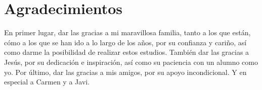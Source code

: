 \vspace{5cm}

\noindent \textbf{\myProf}

\chapter*{Agradecimientos}
\thispagestyle{empty}

       \vspace{1cm}

En primer lugar, dar las gracias a mi maravillosa familia, tanto a los que están, cómo a los que se han ido a lo largo de los años, por su confianza y cariño, así como darme la posibilidad de realizar estos estudios.
\intro También dar las gracias a Jesús, por su dedicación e inspiración, así como su paciencia con un alumno como yo.
\intro Por último, dar las gracias a mis amigos, por su apoyo incondicional. Y en especial a Carmen y a Javi.
